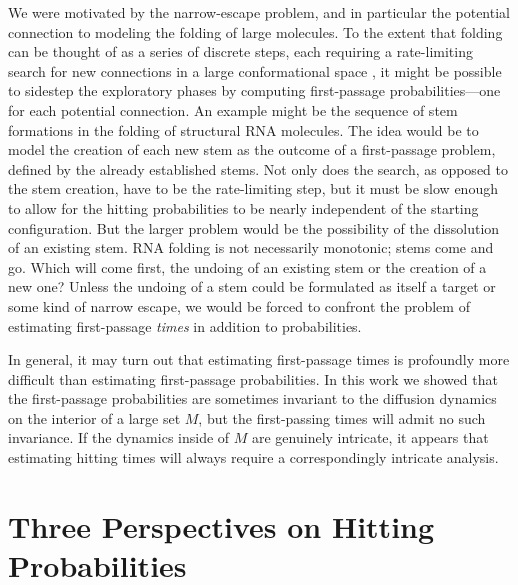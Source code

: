 \documentclass[12pt, nofootinbib,english, amsmath, amssymb, aps, priprint, graphicx,floatfix]{revtex4-1}
\theoremstyle{plain}
\theoremstyle{definition}
\theoremstyle{plain}
\begin{document}
{We were motivated by the narrow-escape problem, and in particular the potential connection to modeling the folding of large molecules. To the extent that folding can be thought of as a series of discrete steps, each requiring a rate-limiting search for  new connections in a large conformational space 
\cite{McLeish2005-dq,Goldberg1999-mv,Jacob1999-bs,Plaxco1998-iv,Wales2006-ur},
it might be possible to sidestep the exploratory phases by computing first-passage probabilities---one for each potential connection. An example might be the sequence of stem formations in the folding of structural RNA molecules.
The idea would be to model the creation of each new stem as the outcome of a first-passage problem, defined by the already established stems. Not only does the search, as opposed to the stem creation, have to be the rate-limiting step, but it must be slow enough to allow for the hitting probabilities to be nearly independent of the starting configuration. 
But the larger problem would be the possibility of the dissolution of an existing stem. RNA folding is not necessarily monotonic; stems come and go. Which will come first, the undoing of an existing stem or the creation of a new one?
Unless the undoing of a stem could be formulated as itself a target
or some kind of narrow escape, we would be forced to confront
the problem of estimating first-passage {\em times} in addition to probabilities. 

In general, it may turn out that estimating first-passage times is profoundly more difficult than estimating first-passage probabilities.  In this work we showed that the first-passage probabilities are sometimes invariant to the diffusion dynamics on the interior of a large set $M$, but the first-passing times will admit no such invariance.   If the dynamics inside of $M$ are genuinely intricate, it appears that estimating hitting times will always require a correspondingly intricate analysis.


\newpage
\appendix
{}



\section{Three Perspectives on Hitting Probabilities}
\label{sec:three_perspectives}

}
\end{document}
